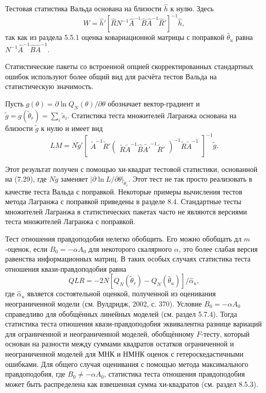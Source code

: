 Тестовая статистика Вальда основана на близости $\hat{h}$ к нулю. Здесь
\begin{equation}
W = \hat{h}'[\hat{R}N^{-1}\hat{A}^{-1}\hat{B}\hat{A}^{-1}\hat{R}']^{-1}\hat{h},
\end{equation}
так как из раздела 5.5.1 оценка ковариационной матрицы с поправкой $\hat{\theta}_u$ равна $N^{-1}\hat{A}^{-1}\hat{B}\hat{A}^{-1}$.

Статистические пакеты со встроенной опцией скорректированных стандартных ошибок используют более общий вид для расчёта тестов Вальда на статистическую значимость.

Пусть $g(\theta) = \partial{\ln Q_N(\theta)}/\partial{\theta}$ обозначает вектор-градиент и $\tilde{g} = g(\tilde{\theta}_r) = \sum_i \tilde{s}_i$. Статистика теста множителей Лагранжа основана на близости $\tilde{g}$ к нулю и имеет вид
\begin{equation}
LM = N\tilde{g}'\begin{bmatrix} \tilde{A}^{-1} \tilde{R}'\begin{pmatrix}\tilde{R} \tilde{A}^{-1} \hat{B}\tilde{A'}^{-1}\tilde{R}'\end{pmatrix}^{-1}\tilde{R}\tilde{A}^{-1}\end{bmatrix}^{-1}\tilde{g}.
\end{equation}

Этот результат получен с помощью хи-квадрат тестовой статистики, основанной на (7.29), где $N\tilde{g}$ заменяет $|\partial{\ln L}/\partial{\theta}|_{\tilde{\theta}_r}$. Этот тест не так просто реализовать в качестве теста Вальда с поправкой. Некоторые примеры вычисления тестов метода Лагранжа с поправкой приведены в разделе 8.4.
Стандартные тесты множителей Лагранжа в статистических пакетах часто не являются версиями теста множителей Лагранжа с поправкой.

Тест отношения правдоподобия нелегко обобщить. Его можно обобщать дл $m$-оценок, если $B_0 = -\alpha A_0$  для некоторого скалярного $\alpha$, это более слабая версия равенства информационных матриц. В таких особых случаях статистика теста отношения квази-правдоподобия равна
\begin{equation}
QLR = -2N[Q_N(\tilde{\theta}_r) - Q_N(\hat{\theta}_u) ]/\hat{\alpha}_u,
\end{equation}
где $\hat{\alpha}_u$ является состоятельной оценкой, полученной из оценивания неограниченной модели (см. Вулдридж, 2002, с. 370). Условие $B_0 = -\alpha A_0$ справедливо для обобщённых линейных моделей (см. раздел 5.7.4). Тогда статистика теста отношения квази-правдоподобия эквивалентна разнице вариаций для ограниченной и неограниченной моделей, обобщённому $F$-тесту, который основан на разности между суммами квадратов остатков ограниченной и неограниченной моделей для МНК и НМНК оценок с гетероскедастичными ошибками. Для общего случая оценивания с помощью метода максимального правдоподобия, где $B_0 \not= - \alpha A_0$, статистика теста отношения правдоподобия может быть распределена как взвешенная сумма хи-квадратов (см. раздел 8.5.3).

